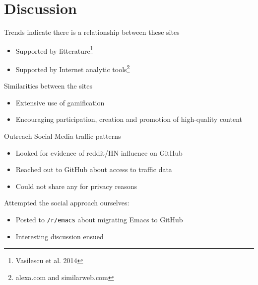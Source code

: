 \documentclass{beamer}
\begin{document}


\section{Discussion}

\begin{frame}
  Trends indicate there is a relationship between these sites
  \begin{itemize}
  \item Supported by litterature\footnote{Vasilescu et al. 2014}
  \item Supported by Internet analytic tools\footnote{alexa.com and similarweb.com}
  \end{itemize}
  Similarities between the sites
  \begin{itemize}
  \item Extensive use of gamification
  \item Encouraging participation, creation and promotion of high-quality content
  \end{itemize}
\end{frame}

\begin{frame}[allowframebreaks]{Outreach}
  Social Media traffic patterns
  \begin{itemize}
  \item Looked for evidence of reddit/HN influence on GitHub
  \item Reached out to GitHub about access to traffic data
  \item Could not share any for privacy reasons
    \end{itemize}

  \framebreak
  
  Attempted the social approach ourselves:
  \begin{itemize}
  \item Posted\footnotemark{} to \texttt{/r/emacs} about migrating Emacs to
    GitHub
  \item Interesting discussion ensued
  \end{itemize}

\end{frame}
\end{document}
